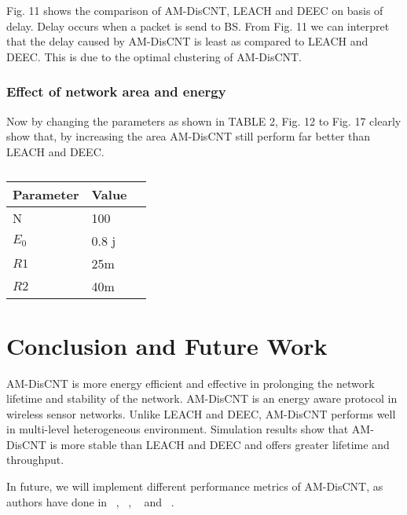 \documentclass[journal]{IEEEtran}
\begin{document}
 Fig. 11 shows the comparison of AM-DisCNT, LEACH and DEEC on basis of delay. Delay occurs when a packet is send to BS. From Fig. 11 we can interpret that the delay caused by AM-DisCNT is least as compared to LEACH and DEEC. This is due to the optimal clustering of AM-DisCNT.
\subsubsection{Effect of network area and energy}
Now by changing the parameters as shown in TABLE 2, Fig. 12 to Fig. 17 clearly show that, by increasing the area AM-DisCNT still perform far better than LEACH and DEEC.

 \begin{table}[htbp]
  \centering
  \caption{}
  \begin{tabular}[height=9cm,width=9cm]{lll}
    \toprule
    Parameter & Value  &  \\
    \midrule

   N            & 100  \\
  $E_0$          & 0.8 j \\
     $R1$        & 25m \\
     $R2$       & 40m \\

     \bottomrule
 \end{tabular}\label{tab:addlabe2}\end{table}


\section{Conclusion and Future Work}
 AM-DisCNT is more energy efficient and effective in prolonging the network lifetime and stability of the network. AM-DisCNT is an energy aware protocol in wireless sensor networks. Unlike LEACH and DEEC, AM-DisCNT performs well in multi-level heterogeneous environment. Simulation results show that AM-DisCNT is more stable than LEACH and DEEC and offers greater lifetime and throughput.

 In future, we will implement different performance metrics of AM-DisCNT, as authors have done in ~\cite{17}, ~\cite{18}, ~\cite{19} and ~\cite{20}.

 \ifCLASSOPTIONcaptionsoff
  \newpage
\fi
\end{document}
